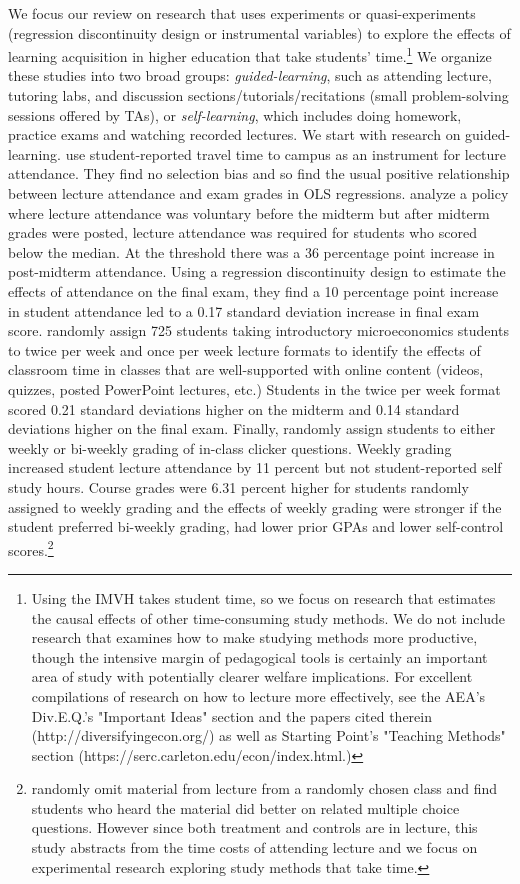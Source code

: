 \documentclass[12pt]{article}
\begin{document}
We focus our review on research that uses experiments or quasi-experiments (regression discontinuity design or instrumental variables) to explore the effects of learning acquisition in higher education that take students' time.\footnote{Using the IMVH takes student time, so we focus on research that estimates the causal effects of other time-consuming study methods. We do not include research that examines how to make studying methods more productive, though the intensive margin of pedagogical tools is certainly an important area of study with potentially clearer welfare implications.  For excellent compilations of research on how to lecture more effectively, see the AEA's Div.E.Q.'s "Important Ideas" section and the papers cited therein (http://diversifyingecon.org/) as well as Starting Point's  "Teaching Methods" section (https://serc.carleton.edu/econ/index.html.)} We organize these studies into two broad groups: \textit{guided-learning}, such as attending lecture, tutoring labs, and discussion sections/tutorials/recitations (small problem-solving sessions offered by TAs), or \textit{self-learning}, which includes doing homework, practice exams and watching recorded lectures. We start with research on guided-learning.  \textcite{km2003} use student-reported travel time to campus as an instrument for lecture attendance. They find no selection bias and so find the usual positive relationship between lecture attendance and exam grades in OLS regressions. \textcite{dgm2010} analyze a policy where lecture attendance was voluntary before the midterm but after midterm grades were posted, lecture attendance was required for students who scored below the median. At the threshold there was a 36 percentage point increase in post-midterm attendance. Using a regression discontinuity design to estimate the effects of attendance on the final exam, they find a 10 percentage point increase in student attendance led to a 0.17 standard deviation increase in final exam score. \textcite{jcjao2015} randomly assign 725 students taking introductory microeconomics students to twice per week and once per week lecture formats to identify the effects of classroom time in classes that are well-supported with online content (videos, quizzes, posted PowerPoint lectures, etc.) Students in the twice per week format scored 0.21 standard deviations higher on the midterm and 0.14 standard deviations higher on the final exam. Finally, \textcite{tlad2020} randomly assign students to either weekly or bi-weekly grading of in-class clicker questions. Weekly grading increased student lecture attendance by 11 percent but not student-reported self study hours. Course grades were 6.31 percent higher for students randomly assigned to weekly grading and the effects of weekly grading were stronger if the student preferred bi-weekly grading, had lower prior GPAs and lower self-control scores.\footnote{\textcite{cl2008} randomly omit material from lecture from a randomly chosen class and find students who heard the material did better on related multiple choice questions. However since both treatment and controls are in lecture, this study abstracts from the time costs of attending lecture and we focus on experimental research exploring study methods that take time.}
\end{document}
